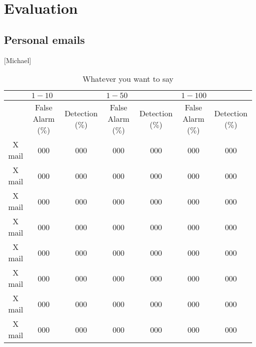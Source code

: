 \documentclass[letterpaper]{article}
\begin{document}
\section{Evaluation}
\subsection{Personal emails}
[Michael]










\begin{table}
\begin{tabular}{|c| c| c| c| c| c| c|}   \hline 
 & \multicolumn{2}{l|}{$1-10$} & \multicolumn{2}{l|}{$1-50$} & \multicolumn{2}{l|}{$1-100$} \\ \hline
  & False Alarm ($\%$)& Detection  ($\%$) & False Alarm ($\%$) & Detection  ($\%$) & False Alarm ($\%$)& Detection  ($\%$) \\ \hline
 X mail & 000 & 000 & 000 & 000 & 000 & 000  \\ \hline
 X mail & 000 & 000 & 000 & 000 & 000 & 000  \\ \hline
 X mail & 000 & 000 & 000 & 000 & 000 & 000  \\ \hline
 X mail & 000 & 000 & 000 & 000 & 000 & 000  \\ \hline
 X mail & 000 & 000 & 000 & 000 & 000 & 000  \\ \hline
 X mail & 000 & 000 & 000 & 000 & 000 & 000  \\ \hline
 X mail & 000 & 000 & 000 & 000 & 000 & 000  \\ \hline 
 X mail & 000 & 000 & 000 & 000 & 000 & 000  \\ \hline   
\end{tabular}
\caption{Whatever you want to say}
\end{table}
\end{document}
